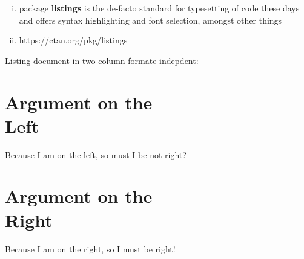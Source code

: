 
\begin{enumerate}[(i)]
    \item package \textbf{listings} is the de-facto standard for typesetting of code these days and offers syntax highlighting and font selection, amongst other things 
    \item https://ctan.org/pkg/listings
\end{enumerate}

Listing document in two column formate indepdent:
\begin{paracol}{2}
    \section{Argument on the\\ Left}
    Because I am on the left, so must I be not right?
  
    \switchcolumn
    \section{Argument on the\\ Right}
    Because I am on the right, so I must be right!
  
    \blindtext
\end{paracol}